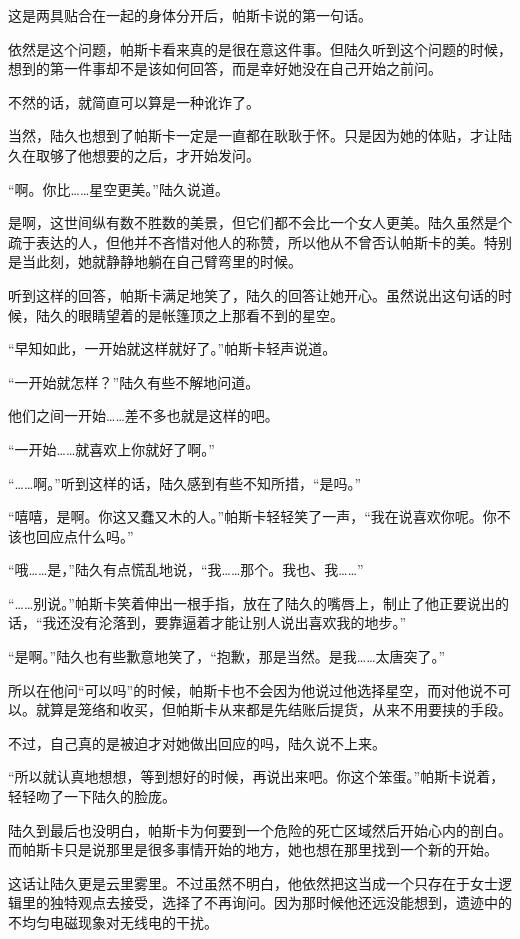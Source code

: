 这是两具贴合在一起的身体分开后，帕斯卡说的第一句话。

依然是这个问题，帕斯卡看来真的是很在意这件事。但陆久听到这个问题的时候，想到的第一件事却不是该如何回答，而是幸好她没在自己开始之前问。

不然的话，就简直可以算是一种讹诈了。

当然，陆久也想到了帕斯卡一定是一直都在耿耿于怀。只是因为她的体贴，才让陆久在取够了他想要的之后，才开始发问。

“啊。你比……星空更美。”陆久说道。

是啊，这世间纵有数不胜数的美景，但它们都不会比一个女人更美。陆久虽然是个疏于表达的人，但他并不吝惜对他人的称赞，所以他从不曾否认帕斯卡的美。特别是当此刻，她就静静地躺在自己臂弯里的时候。

听到这样的回答，帕斯卡满足地笑了，陆久的回答让她开心。虽然说出这句话的时候，陆久的眼睛望着的是帐篷顶之上那看不到的星空。

“早知如此，一开始就这样就好了。”帕斯卡轻声说道。

“一开始就怎样？”陆久有些不解地问道。

他们之间一开始……差不多也就是这样的吧。

“一开始……就喜欢上你就好了啊。”

“……啊。”听到这样的话，陆久感到有些不知所措，“是吗。”

“嘻嘻，是啊。你这又蠢又木的人。”帕斯卡轻轻笑了一声，“我在说喜欢你呢。你不该也回应点什么吗。”

“哦……是，”陆久有点慌乱地说，“我……那个。我也、我……”

“……别说。”帕斯卡笑着伸出一根手指，放在了陆久的嘴唇上，制止了他正要说出的话，“我还没有沦落到，要靠逼着才能让别人说出喜欢我的地步。”

“是啊。”陆久也有些歉意地笑了，“抱歉，那是当然。是我……太唐突了。”

所以在他问“可以吗”的时候，帕斯卡也不会因为他说过他选择星空，而对他说不可以。就算是笼络和收买，但帕斯卡从来都是先结账后提货，从来不用要挟的手段。

不过，自己真的是被迫才对她做出回应的吗，陆久说不上来。

“所以就认真地想想，等到想好的时候，再说出来吧。你这个笨蛋。”帕斯卡说着，轻轻吻了一下陆久的脸庞。

陆久到最后也没明白，帕斯卡为何要到一个危险的死亡区域然后开始心内的剖白。而帕斯卡只是说那里是很多事情开始的地方，她也想在那里找到一个新的开始。

这话让陆久更是云里雾里。不过虽然不明白，他依然把这当成一个只存在于女士逻辑里的独特观点去接受，选择了不再询问。因为那时候他还远没能想到，遗迹中的不均匀电磁现象对无线电的干扰。

